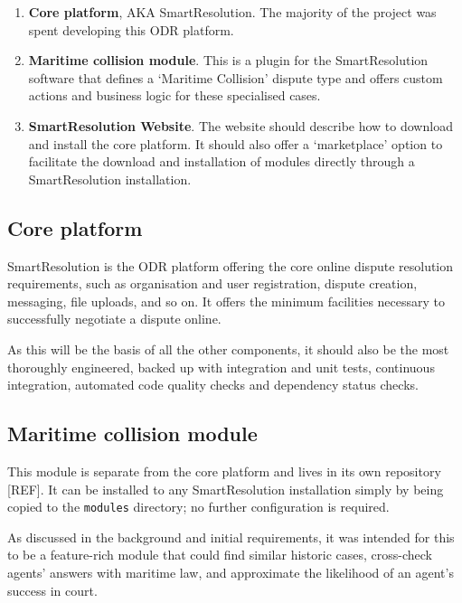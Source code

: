 \begin{enumerate}
    \item \textbf{Core platform}, AKA SmartResolution. The majority of the project was spent developing this ODR platform.
    
    \item \textbf{Maritime collision module}. This is a plugin for the SmartResolution software that defines a `Maritime Collision' dispute type and offers custom actions and business logic for these specialised cases.
    
    \item \textbf{SmartResolution Website}. The website should describe how to download and install the core platform. It should also offer a `marketplace' option to facilitate the download and installation of modules directly through a SmartResolution installation.
\end{enumerate}

\subsection{Core platform}

SmartResolution is the ODR platform offering the core online dispute resolution requirements, such as organisation and user registration, dispute creation, messaging, file uploads, and so on. It offers the minimum facilities necessary to successfully negotiate a dispute online.

As this will be the basis of all the other components, it should also be the most thoroughly engineered, backed up with integration and unit tests, continuous integration, automated code quality checks and dependency status checks.

\subsection{Maritime collision module}

This module is separate from the core platform and lives in its own repository [REF]. It can be installed to any SmartResolution installation simply by being copied to the \lstinline{modules} directory; no further configuration is required.

As discussed in the background and initial requirements, it was intended for this to be a feature-rich module that could find similar historic cases, cross-check agents' answers with maritime law, and approximate the likelihood of an agent's success in court.


